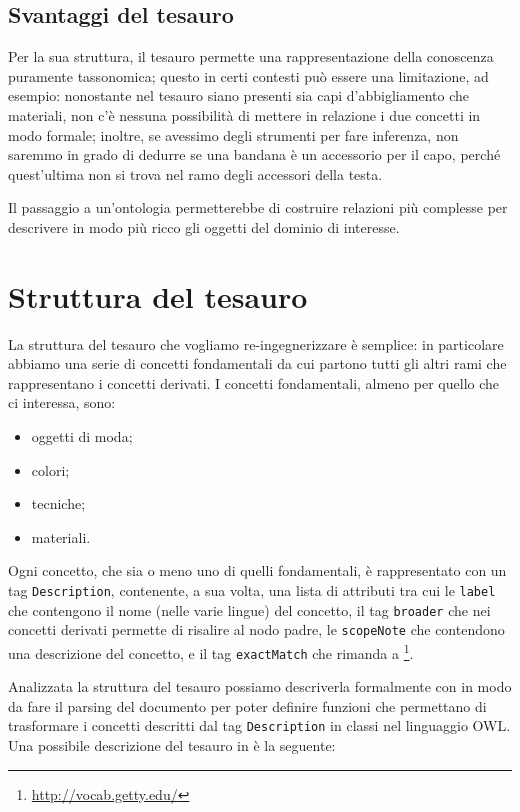 \subsection{Svantaggi del tesauro}
Per la sua struttura, il tesauro permette una rappresentazione della conoscenza puramente tassonomica; questo in certi contesti può essere una limitazione, ad esempio: nonostante nel tesauro siano presenti sia capi d'abbigliamento che materiali, non c'è nessuna possibilità di mettere in relazione i due concetti in modo formale; inoltre, se avessimo degli strumenti per fare inferenza, non saremmo in grado di dedurre se una bandana è un accessorio per il capo, perché quest'ultima non si trova nel ramo degli accessori della testa.

Il passaggio a un'ontologia permetterebbe di costruire relazioni più complesse per descrivere in modo più ricco gli oggetti del dominio di interesse.
\section{Struttura del tesauro}
La struttura del tesauro che vogliamo re-ingegnerizzare è semplice: in particolare abbiamo una serie di concetti fondamentali da cui partono tutti gli altri rami che rappresentano i concetti derivati. I concetti fondamentali, almeno per quello che ci interessa, sono:
\begin{itemize}
	\item oggetti di moda;
	\item colori;
	\item tecniche;
	\item materiali.
\end{itemize}
Ogni concetto, che sia o meno uno di quelli fondamentali, è rappresentato con un tag \verb|Description|, contenente, a sua volta, una lista di attributi tra cui le \verb|label| che contengono il nome (nelle varie lingue) del concetto, il tag \verb|broader| che nei concetti derivati permette di risalire al nodo padre, le \verb|scopeNote| che contendono una descrizione del concetto, e il tag \verb|exactMatch| che rimanda a \footnote{\url{http://vocab.getty.edu/}}.

Analizzata la struttura del tesauro possiamo descriverla formalmente con \cduce in modo da fare il parsing del documento per poter definire funzioni che permettano di trasformare i concetti descritti dal tag \verb|Description| in classi nel linguaggio OWL. Una possibile descrizione del tesauro in \cduce è la seguente:
